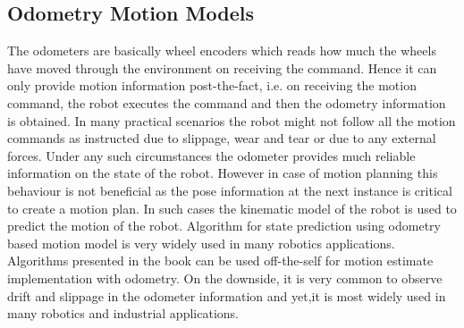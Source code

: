 \subsection{Odometry Motion Models}
The odometers are basically wheel encoders which reads how much the wheels have moved through the environment on receiving the command. Hence it can only provide motion information post-the-fact, i.e. on receiving the motion command, the robot executes the command and then the odometry information is obtained. In many practical scenarios the robot might not follow all the motion commands as instructed due to slippage, wear and tear or due to any external forces. Under any such circumstances the odometer 
provides much reliable information on the state of the robot. However 
in case of motion planning this behaviour is not beneficial as the pose information at the next instance is critical to create a motion plan. In such cases the kinematic model of the 
robot is used to predict the motion of the robot. 
Algorithm for state prediction using odometry based motion model is very widely used in many robotics applications. Algorithms presented in the book \cite{Thrun98aprobabilistic} can be used off-the-self 
for motion estimate implementation with odometry.
On the downside, it is very common to observe drift and slippage in the odometer information and yet,it is most widely used in many robotics and industrial applications.

